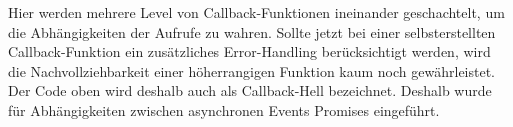 \noindent
Hier werden mehrere Level von Callback-Funktionen ineinander geschachtelt, um die Abhängigkeiten der Aufrufe zu wahren. Sollte jetzt bei einer selbsterstellten Callback-Funktion ein zusätzliches Error-Handling berücksichtigt werden, wird die Nachvollziehbarkeit einer höherrangigen Funktion kaum noch gewährleistet. Der Code oben wird deshalb auch als Callback-Hell bezeichnet. Deshalb wurde für Abhängigkeiten zwischen asynchronen Events Promises eingeführt.




